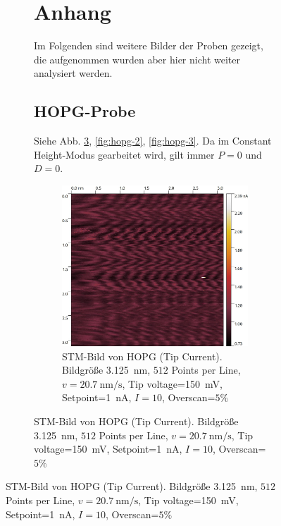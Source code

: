 \documentclass{article}
\begin{document}
\begin{figure}[h]
\begin{figure}[h]
\clearpage
\section{Anhang}
Im Folgenden sind weitere Bilder der Proben gezeigt, die aufgenommen wurden aber hier nicht weiter analysiert werden.

\subsection{HOPG-Probe}
Siehe Abb. \ref{fig:hopg-1}, \ref{fig:hopg-2}, \ref{fig:hopg-3}. Da im Constant Height-Modus gearbeitet wird, gilt immer $P=0$ und $D=0$.

\begin{figure}[h]
    \centering
    \begin{minipage}{0.49\textwidth}
        \centering
        \includegraphics[width=\textwidth]{Image20212}
        \caption{
            STM-Bild von HOPG (Tip Current). Bildgröße \SI{3.125}{\nm}, $512$ Points per Line,
            $v=\SI{20.7}{\nm\per\s}$, Tip voltage=\SI{150}{\mV}, Setpoint=\SI{1}{\nA}, $I=10$, Overscan=$5\%$
        }
        \label{fig:hopg-1}
    \end{minipage}
    \hfill
    \begin{minipage}{0.49\textwidth}
        \centering

\end{minipage}
\end{figure}
\end{figure}
\end{figure}
\end{document}
